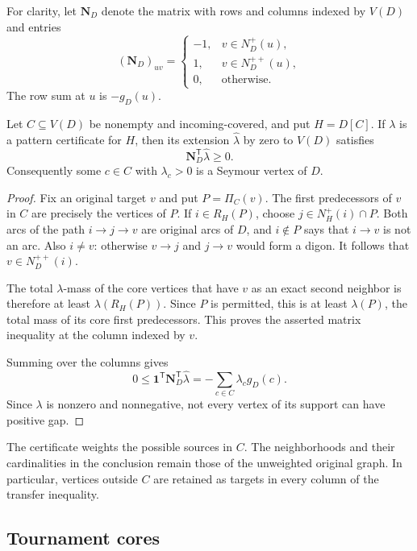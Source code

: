 For clarity, let $\mathbf N_D$ denote the matrix with rows and columns
indexed by $V(D)$ and entries
\[
 (\mathbf N_D)_{uv}=
 \begin{cases}
 -1,&v\in N_D^+(u),\\
  1,&v\in N_D^{++}(u),\\
  0,&\text{otherwise}.
 \end{cases}
\]
The row sum at $u$ is $-g_D(u)$.

\begin{theorem}
\label{thm:pattern-transfer}
Let $C\subseteq V(D)$ be nonempty and incoming-covered, and put $H=D[C]$.
If $\lambda$ is a pattern certificate for $H$, then its extension
$\widehat\lambda$ by zero to $V(D)$ satisfies
\[
 \mathbf N_D^{\mathsf T}\widehat\lambda\geq0.
\]
Consequently some $c\in C$ with $\lambda_c>0$ is a Seymour vertex of $D$.
\end{theorem}
\begin{proof}
Fix an original target $v$ and put $P=\Pi_C(v)$. The first predecessors of
$v$ in $C$ are precisely the vertices of $P$. If $i\in R_H(P)$, choose
$j\in N_H^+(i)\cap P$. Both arcs of the path $i\to j\to v$ are
original arcs of $D$, and $i\notin P$ says that $i\to v$ is not an arc.
Also $i\ne v$: otherwise $v\to j$ and $j\to v$ would form a digon.
It follows that $v\in N_D^{++}(i)$.

The total $\lambda$-mass of the core vertices that have $v$ as an exact
second neighbor is therefore at least $\lambda(R_H(P))$. Since $P$ is
permitted, this is at least $\lambda(P)$, the total mass of its core
first predecessors. This proves the asserted matrix inequality at the
column indexed by $v$.

Summing over the columns gives
\[
 0\leq\mathbf1^{\mathsf T}\mathbf N_D^{\mathsf T}\widehat\lambda
       =-\sum_{c\in C}\lambda_c g_D(c).
\]
Since $\lambda$ is nonzero and nonnegative, not every vertex of its
support can have positive gap.
\end{proof}

The certificate weights the possible sources in $C$. The neighborhoods
and their cardinalities in the conclusion remain those of the unweighted
original graph. In particular, vertices outside $C$ are retained as
targets in every column of the transfer inequality.

\subsection{Tournament cores}

